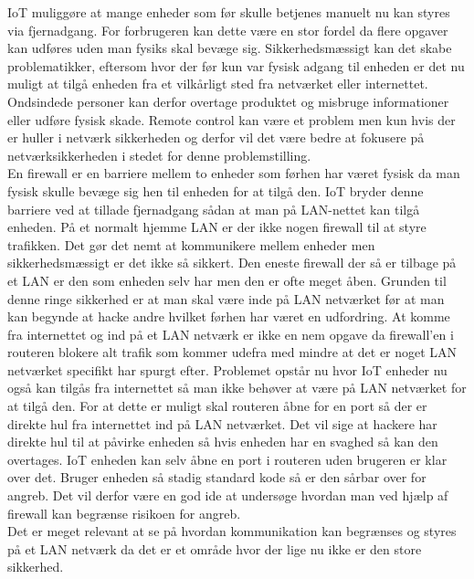     IoT muliggøre at mange enheder som før skulle betjenes manuelt nu kan styres via fjernadgang. For forbrugeren kan dette være en stor fordel da flere opgaver kan udføres uden man fysiks skal bevæge sig. Sikkerhedsmæssigt kan det skabe problematikker, eftersom hvor der før kun var fysisk adgang til enheden er det nu muligt at tilgå enheden fra et vilkårligt sted fra netværket eller internettet.\\ 
    Ondsindede personer kan derfor overtage produktet og misbruge informationer eller udføre fysisk skade. Remote control kan være et problem men kun hvis der er huller i netværk sikkerheden og derfor vil det være bedre at fokusere på netværksikkerheden i stedet for denne problemstilling.\autocite{Forbes2017}\\
    
    En firewall er en barriere mellem to enheder som førhen har været fysisk da man fysisk skulle bevæge sig hen til enheden for at tilgå den. IoT bryder denne barriere ved at tillade fjernadgang sådan at man på LAN-nettet kan tilgå enheden. På et normalt hjemme LAN er der ikke nogen firewall til at styre trafikken. Det gør det nemt at kommunikere mellem enheder men sikkerhedsmæssigt er det ikke så sikkert. Den eneste firewall der så er tilbage på et LAN er den som enheden selv har men den er ofte meget åben. Grunden til denne ringe sikkerhed er at man skal være inde på LAN netværket før at man kan begynde at hacke andre hvilket førhen har været en udfordring. At komme fra internettet og ind på et LAN netværk er ikke en nem opgave da firewall'en i routeren blokere alt trafik som kommer udefra med mindre at det er noget LAN netværket specifikt har spurgt efter. Problemet opstår nu hvor IoT enheder nu også kan tilgås fra internettet så man ikke behøver at være på LAN netværket for at tilgå den. For at dette er muligt skal routeren åbne for en port så der er direkte hul fra internettet ind på LAN netværket. Det vil sige at hackere har direkte hul til at påvirke enheden så hvis enheden har en svaghed så kan den overtages. IoT enheden kan selv åbne en port i routeren uden brugeren er klar over det. Bruger enheden så stadig standard kode så er den sårbar over for angreb. Det vil derfor være en god ide at undersøge hvordan man ved hjælp af firewall kan begrænse risikoen for angreb.\\
    Det er meget relevant at se på hvordan kommunikation kan begrænses og styres på et LAN netværk da det er et område hvor der lige nu ikke er den store sikkerhed.
    
